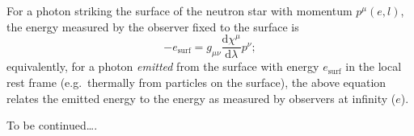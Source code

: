 \documentclass[modern]{aastex631}
\newcommand{\dd}{\mathrm{d}}
\begin{document}
For a photon striking the surface of the neutron star with momentum $p^\mu\left(
e, l \right)$, the energy measured by the observer fixed to the surface is 
\begin{equation}
    -e_\mathrm{surf} = g_{\mu\nu} \frac{\dd \chi^\mu}{\dd \lambda} p^\nu;
\end{equation}
equivalently, for a photon \emph{emitted} from the surface with energy
$e_\mathrm{surf}$ in the local rest frame (e.g.\ thermally from particles on the
surface), the above equation relates the emitted energy to the energy as
measured by observers at infinity ($e$).

To be continued\ldots.


\end{document}
